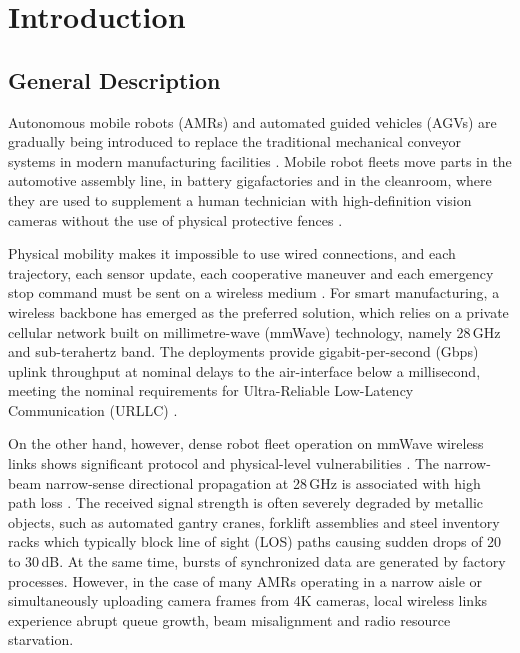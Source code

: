 \documentclass[twocolumn,10pt,twoside]{article}
\begin{document}
\begingroup
\renewcommand{\thefootnote}{\fnsymbol{footnote}}
\endgroup

\section{Introduction}
\subsection{General Description}
Autonomous mobile robots (AMRs) and automated guided vehicles (AGVs) are gradually being introduced to replace the traditional mechanical conveyor systems in modern manufacturing facilities \cite{fallahi2026dt, saad2020vision}. Mobile robot fleets move parts in the automotive assembly line, in battery gigafactories and in the cleanroom, where they are used to supplement a human technician with high-definition vision cameras without the use of physical protective fences \cite{erel2026smart, letaief2019roadmap}.

Physical mobility makes it impossible to use wired connections, and each trajectory, each sensor update, each cooperative maneuver and each emergency stop command must be sent on a wireless medium \cite{chaccour2022urllc, wang2023semanticicps}. For smart manufacturing, a wireless backbone has emerged as the preferred solution, which relies on a private cellular network built on millimetre-wave (mmWave) technology, namely 28\,GHz and sub-terahertz band. The deployments provide gigabit-per-second (Gbps) uplink throughput at nominal delays to the air-interface below a millisecond, meeting the nominal requirements for Ultra-Reliable Low-Latency Communication (URLLC) \cite{chaccour2022urllc}.

On the other hand, however, dense robot fleet operation on mmWave wireless links shows significant protocol and physical-level vulnerabilities \cite{rrm2026survey, survey2026comprehensive}. The narrow-beam narrow-sense directional propagation at 28\,GHz is associated with high path loss \cite{alhourani2021mmwave}. The received signal strength is often severely degraded by metallic objects, such as automated gantry cranes, forklift assemblies and steel inventory racks which typically block line of sight (LOS) paths causing sudden drops of 20 to 30\,dB. At the same time, bursts of synchronized data are generated by factory processes. However, in the case of many AMRs operating in a narrow aisle or simultaneously uploading camera frames from 4K cameras, local wireless links experience abrupt queue growth, beam misalignment and radio resource starvation.
\end{document}
